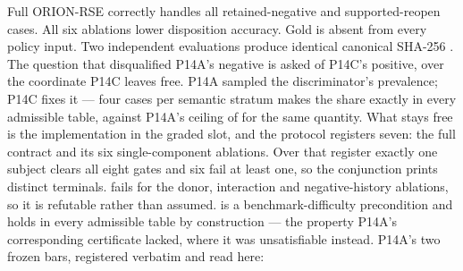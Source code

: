 {}Full ORION-RSE correctly handles all retained-negative and supported-reopen cases. All six ablations lower disposition accuracy. Gold is absent from every policy input. Two independent evaluations produce identical canonical SHA-256 .\markdownRendererInterblockSeparator
{}\markdownRendererSectionBegin
{}\markdownRendererInterblockSeparator
{}The question that disqualified P14A's negative is asked of P14C's positive, over the coordinate P14C leaves free. P14A sampled the discriminator's prevalence; P14C fixes it — four cases per semantic stratum makes the  share exactly  in every admissible table, against P14A's ceiling of  for the same quantity. What stays free is the implementation in the graded slot, and the protocol registers seven: the full contract and its six single-component ablations.\markdownRendererInterblockSeparator
{}Over that register exactly one subject clears all eight gates and six fail at least one, so the conjunction prints  distinct terminals.  fails for the donor, interaction and negative-history ablations, so it is refutable rather than assumed.  is a benchmark-difficulty precondition and holds in every admissible table by construction — the property P14A's corresponding certificate lacked, where it was unsatisfiable instead.\markdownRendererInterblockSeparator
{}P14A's two frozen bars, registered verbatim and read here:\markdownRendererInterblockSeparator
{}\markdownRendererInterblockSeparator
